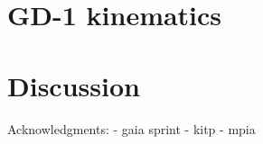 \documentclass[twocolumn]{aastex63}
\begin{document}



\section{GD-1 kinematics}
\label{sec:kinematics}




\section{Discussion}
\label{sec:discussion}


Acknowledgments: 
- gaia sprint
- kitp
- mpia



\end{document}
